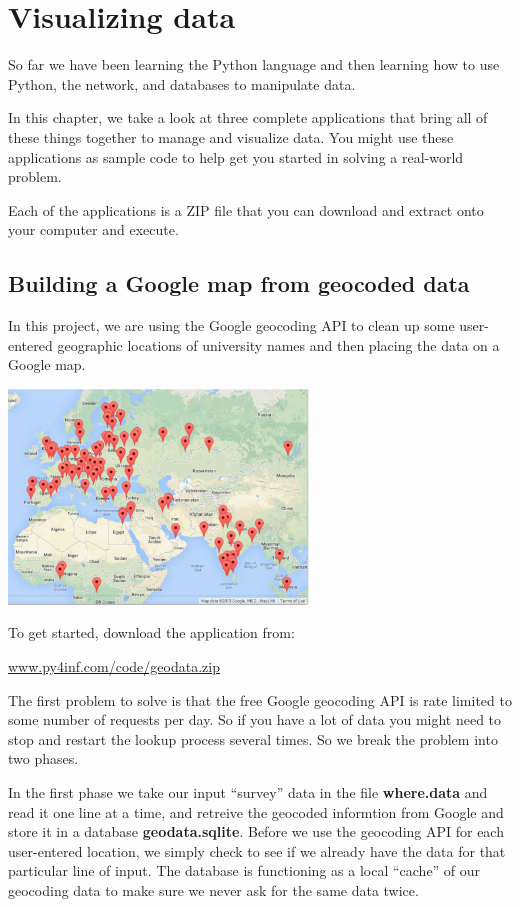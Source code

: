 \documentclass[11pt]{book}
\begin{document}
\chapter{Visualizing data}

So far we have been learning the Python language and then 
learning how to use Python, the network, and databases 
to manipulate data.

In this chapter, we take a look at 
three 
complete applications that bring all of these things together
to manage and visualize data.  You  might use these applications 
as sample code to help get you started in solving a
real-world problem.

Each of the applications is a ZIP file that you can download
and extract onto your computer and execute.

\section{Building a Google map from geocoded data}

In this project, we are using the Google geocoding API
to clean up some user-entered geographic locations of 
university names and then placing the data on a Google
map.  

\beforefig
\centerline{\includegraphics[height=2.25in]{figs2/google-map.eps}}
\afterfig

To get started, download the application from:

\url{www.py4inf.com/code/geodata.zip}

The first problem to solve is that the free Google geocoding
API is rate limited to some number of requests per day.  So if you have
a lot of data you might need to stop and restart the lookup
process several times.  So we break the problem into two
phases.  

In the first phase we take our input ``survey'' data in the file
{\bf where.data} and read it one line at a time, and retreive the
geocoded informtion from Google and store it 
in a database {\bf geodata.sqlite}.
Before we use the geocoding API for each user-entered location, 
we simply check to see if we already have the data for that 
particular line of input.  The database is functioning as a 
local ``cache'' of our geocoding data to make sure we never ask 
for the same data twice.
\end{document}
